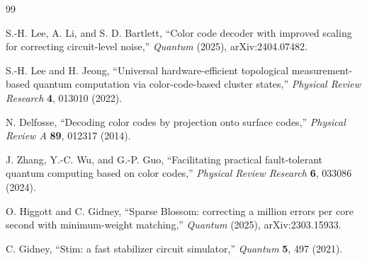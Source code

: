 \documentclass[a4paper,11pt]{ltjsarticle}
\begin{document}
\begin{thebibliography}{99}

S.-H. Lee, A. Li, and S. D. Bartlett,
``Color code decoder with improved scaling for correcting circuit-level noise,''
\emph{Quantum} (2025), arXiv:2404.07482.

S.-H. Lee and H. Jeong,
``Universal hardware-efficient topological measurement-based quantum computation via color-code-based cluster states,''
\emph{Physical Review Research} \textbf{4}, 013010 (2022).

N. Delfosse,
``Decoding color codes by projection onto surface codes,''
\emph{Physical Review A} \textbf{89}, 012317 (2014).

J. Zhang, Y.-C. Wu, and G.-P. Guo,
``Facilitating practical fault-tolerant quantum computing based on color codes,''
\emph{Physical Review Research} \textbf{6}, 033086 (2024).

O. Higgott and C. Gidney,
``Sparse Blossom: correcting a million errors per core second with minimum-weight matching,''
\emph{Quantum} (2025), arXiv:2303.15933.

C. Gidney,
``Stim: a fast stabilizer circuit simulator,''
\emph{Quantum} \textbf{5}, 497 (2021).

\end{thebibliography}
\end{document}
